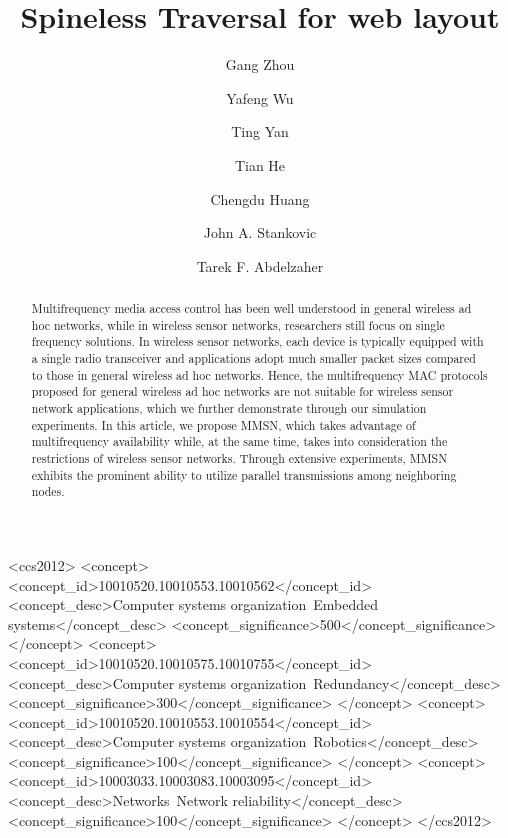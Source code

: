 \documentclass[format=acmsmall, review=false, screen=true]{acmart}
\begin{document}
\title[Spineless]{Spineless Traversal for web layout}  
\author{Gang Zhou}
\author{Yafeng Wu}
\author{Ting Yan}
\author{Tian He}
\author{Chengdu Huang}
\author{John A. Stankovic}
\author{Tarek F. Abdelzaher}

\begin{abstract}
Multifrequency media access control has been well understood in
general wireless ad hoc networks, while in wireless sensor networks,
researchers still focus on single frequency solutions. In wireless
sensor networks, each device is typically equipped with a single
radio transceiver and applications adopt much smaller packet sizes
compared to those in general wireless ad hoc networks. Hence, the
multifrequency MAC protocols proposed for general wireless ad hoc
networks are not suitable for wireless sensor network applications,
which we further demonstrate through our simulation experiments. In
this article, we propose MMSN, which takes advantage of
multifrequency availability while, at the same time, takes into
consideration the restrictions of wireless sensor networks. Through
extensive experiments, MMSN exhibits the prominent ability to utilize
parallel transmissions among neighboring nodes. 
\end{abstract}


%
%
\begin{CCSXML}
<ccs2012>
 <concept>
  <concept_id>10010520.10010553.10010562</concept_id>
  <concept_desc>Computer systems organization~Embedded systems</concept_desc>
  <concept_significance>500</concept_significance>
 </concept>
 <concept>
  <concept_id>10010520.10010575.10010755</concept_id>
  <concept_desc>Computer systems organization~Redundancy</concept_desc>
  <concept_significance>300</concept_significance>
 </concept>
 <concept>
  <concept_id>10010520.10010553.10010554</concept_id>
  <concept_desc>Computer systems organization~Robotics</concept_desc>
  <concept_significance>100</concept_significance>
 </concept>
 <concept>
  <concept_id>10003033.10003083.10003095</concept_id>
  <concept_desc>Networks~Network reliability</concept_desc>
  <concept_significance>100</concept_significance>
 </concept>
</ccs2012>  
\end{CCSXML}
\end{document}
